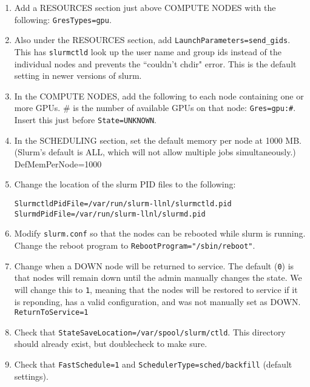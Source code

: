 \begin{enumerate}
\begin{enumerate}
\begin{enumerate}
		\item Add a RESOURCES section just above COMPUTE NODES with the following: \texttt{GresTypes=gpu}.

		\item Also under the RESOURCES section, add \texttt{LaunchParameters=send\_gids}. This has \texttt{slurmctld} look up the user name and group ids instead of the individual nodes and prevents the ``couldn't chdir" error. This is the default setting in newer versions of slurm.

		\item In the COMPUTE NODES, add the following to each node containing one or more GPUs. \# is the number of available GPUs on that node: \texttt{Gres=gpu:\#}. Insert this just before \texttt{State=UNKNOWN}.

		\item In the SCHEDULING section, set the default memory per node at 1000 MB. (Slurm's default is ALL, which will not allow multiple jobs simultaneously.) \\
		DefMemPerNode=1000

		\item Change the location of the slurm PID files to the following:

		\texttt{SlurmctldPidFile=/var/run/slurm-llnl/slurmctld.pid} \\ %
		\texttt{SlurmdPidFile=/var/run/slurm-llnl/slurmd.pid} %

		\item Modify \texttt{slurm.conf} so that the nodes can be rebooted while slurm is running. Change the reboot program to \texttt{RebootProgram="/sbin/reboot"}. 

		\item Change when a DOWN node will be returned to service. The default (\texttt{0}) is that nodes will remain down until the admin manually changes the state. We will change this to \texttt{1}, meaning that the nodes will be restored to service if it is reponding, has a valid configuration, and was not manually set as DOWN. \\
		\texttt{ReturnToService=1}

		\item Check that \texttt{StateSaveLocation=/var/spool/slurm/ctld}. This directory should already exist, but doublecheck to make sure.

		\item Check that \texttt{FastSchedule=1} and \texttt{SchedulerType=sched/backfill} (default settings).
	

\end{enumerate}
\end{enumerate}
\end{enumerate}

